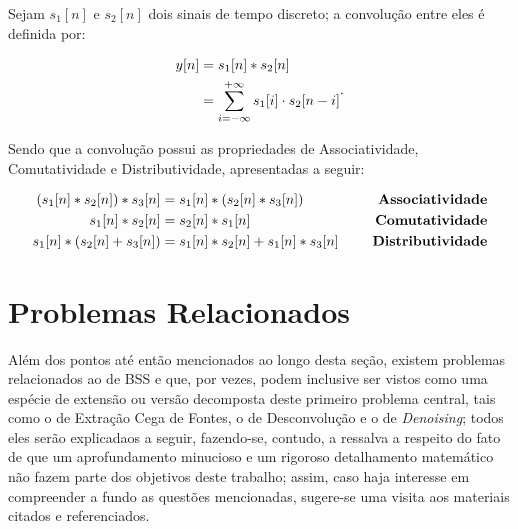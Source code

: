 \begin{definition}[Convolução]
    Sejam $s_{1}[n]$ e $s_{2}[n]$ dois sinais de tempo discreto; a convolução entre eles é definida por:

    \begin{equation}
    \begin{aligned}
        y[n]    & = s_{1}[n] \ast s_{2}[n] \\
                & = \sum_{i=-\infty}^{+\infty} s_{1}[i]\cdot s_{2}[n - i]
    \end{aligned}
    \vspace{0.2cm}.
    \end{equation}

    \noindent Sendo que a convolução possui as propriedades de Associatividade, Comutatividade e Distributividade, apresentadas a seguir:

    \begin{equation*}
    \begin{aligned}
        (s_{1}[n] \ast s_{2}[n]) \ast s_{3}[n] & =  s_{1}[n] \ast (s_{2}[n] \ast s_{3}[n]) & \hspace{0.5cm}\text{\textbf{Associatividade}} \\
        s_{1}[n] \ast s_{2}[n] & = s_{2}[n] \ast s_{1}[n] & \hspace{0.5cm}\text{\textbf{Comutatividade}} \\
        s_{1}[n] \ast (s_{2}[n] + s_{3}[n]) & = s_{1}[n] \ast s_{2}[n] + s_{1}[n] \ast s_{3}[n] & \hspace{0.5cm}\text{\textbf{Distributividade}}
    \end{aligned}
    \vspace{0.2cm}
    \end{equation*}

\end{definition}





\section{Problemas Relacionados}
\label{sec:bss_correlated_problems}

Além dos pontos até então mencionados ao longo desta seção, existem problemas relacionados ao de BSS e que, por vezes, podem inclusive ser vistos como uma espécie de extensão ou versão decomposta deste primeiro problema central, tais como o de Extração Cega de Fontes, o de Desconvolução e o de \textit{Denoising}; todos eles serão explicadaos a seguir, fazendo-se, contudo, a ressalva a respeito do fato de que um aprofundamento minucioso e um rigoroso detalhamento matemático não fazem parte dos objetivos deste trabalho; assim, caso haja interesse em compreender a fundo as questões mencionadas, sugere-se uma visita aos materiais citados e referenciados.



